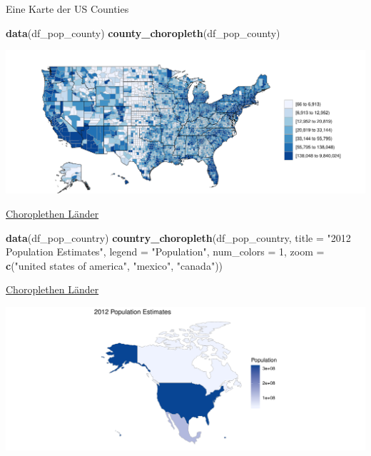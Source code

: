 \documentclass[ignorenonframetext,]{beamer}
\newenvironment{Shaded}{\begin{snugshade}}{\end{snugshade}}
\newcommand{\KeywordTok}[1]{\textcolor[rgb]{0.13,0.29,0.53}{\textbf{#1}}}
\newcommand{\DataTypeTok}[1]{\textcolor[rgb]{0.13,0.29,0.53}{#1}}
\newcommand{\DecValTok}[1]{\textcolor[rgb]{0.00,0.00,0.81}{#1}}
\newcommand{\StringTok}[1]{\textcolor[rgb]{0.31,0.60,0.02}{#1}}
\newcommand{\NormalTok}[1]{#1}
\begin{document}
\begin{frame}[fragile]{Eine Karte der US Counties}

\begin{Shaded}
\begin{Highlighting}[]
\KeywordTok{data}\NormalTok{(df_pop_county)}
\KeywordTok{county_choropleth}\NormalTok{(df_pop_county)}
\end{Highlighting}
\end{Shaded}

\includegraphics{Choroplethen_files/figure-beamer/unnamed-chunk-23-1.pdf}

\end{frame}

\begin{frame}[fragile]{\href{http://mirrors.softliste.de/cran/web/packages/choroplethr/vignettes/d-country-choropleth.html}{Choroplethen
Länder}}

\begin{Shaded}
\begin{Highlighting}[]
\KeywordTok{data}\NormalTok{(df_pop_country)}
\KeywordTok{country_choropleth}\NormalTok{(df_pop_country,}
              \DataTypeTok{title      =} \StringTok{"2012 Population Estimates"}\NormalTok{,}
              \DataTypeTok{legend     =} \StringTok{"Population"}\NormalTok{,}
              \DataTypeTok{num_colors =} \DecValTok{1}\NormalTok{,}
              \DataTypeTok{zoom       =} \KeywordTok{c}\NormalTok{(}\StringTok{"united states of america"}\NormalTok{,}
                             \StringTok{"mexico"}\NormalTok{, }\StringTok{"canada"}\NormalTok{))}
\end{Highlighting}
\end{Shaded}

\end{frame}

\begin{frame}{\href{http://mirrors.softliste.de/cran/web/packages/choroplethr/vignettes/d-country-choropleth.html}{Choroplethen
Länder}}

\includegraphics{Choroplethen_files/figure-beamer/unnamed-chunk-25-1.pdf}

\end{frame}
\end{document}
